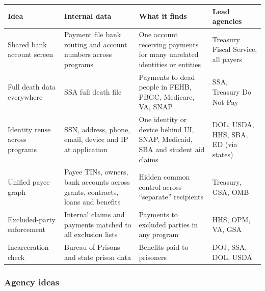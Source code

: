 \documentclass[letterpaper,11pt]{article}
\begin{document}
\begingroup\small\setlength{\tabcolsep}{4pt}\renewcommand{\arraystretch}{1.25}
\begin{longtable}[l]{@{}>{\raggedright\arraybackslash}p{}>{\raggedright\arraybackslash}p{}>{\raggedright\arraybackslash}p{}>{\raggedright\arraybackslash}p{}@{}}
\rowcolor{coolblack}\leavevmode\color{white}\bfseries Idea & \leavevmode\color{white}\bfseries Internal data & \leavevmode\color{white}\bfseries What it finds & \leavevmode\color{white}\bfseries Lead agencies \\
\endhead
Shared bank account screen & Payment file bank routing and account numbers across programs & One account receiving payments for many unrelated identities or entities & Treasury Fiscal Service, all payers \\
Full death data everywhere & SSA full death file & Payments to dead people in FEHB, PBGC, Medicare, VA, SNAP & SSA, Treasury Do Not Pay \\
Identity reuse across programs & SSN, address, phone, email, device and IP at application & One identity or device behind UI, SNAP, Medicaid, SBA and student aid claims & DOL, USDA, HHS, SBA, ED (via states) \\
Unified payee graph & Payee TINs, owners, bank accounts across grants, contracts, loans and benefits & Hidden common control across ``separate'' recipients & Treasury, GSA, OMB \\
Excluded-party enforcement & Internal claims and payments matched to all exclusion lists & Payments to excluded parties in any program & HHS, OPM, VA, GSA \\
Incarceration check & Bureau of Prisons and state prison data & Benefits paid to prisoners & DOJ, SSA, DOL, USDA \\
\end{longtable}\endgroup

\hypertarget{agency-ideas}{%
\subsubsection{Agency ideas}\label{agency-ideas}}
\end{document}
